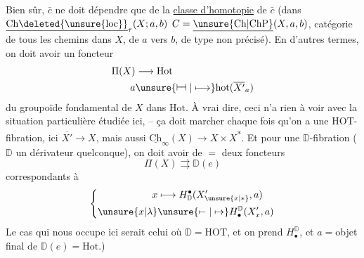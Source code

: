 Bien sûr, $\bar c$ ne doit dépendre que de la
\uline{classe d'homotopie} de $\bar c$ (dans $\underline{\mathrm{Ch}\deleted{\unsure{\mathrm{loc}}}}_{\tau}(X;a,b)$ 
   $C=\underline{\unsure{\mathrm{Ch}|\mathrm{ChP}}}(X,a,b)$, catégorie de
tous les chemins dans $X$, de $a$ vers $b$, de
type non précisé). En d'autres termes, on
doit avoir un foncteur
\[
\begin{aligned}
\Pi(X)&\longrightarrow\mathrm{Hot}\\
a&\unsure{\mathrel{\vdash\!\dashv}|\longmapsto}\mathrm{hot}(\overline{X'}_a)
\end{aligned}
\]
du groupoïde fondamental de $X$ dans $\mathrm{Hot}$.
 À vrai dire, ceci n'a rien à
voir avec la situation particulière étudiée
ici, -- ça doit marcher chaque fois qu'on
a une $\mathrm{HOT}$-fibration, ici $\overline{X'}\longrightarrow X$,
mais aussi $\underline{\mathrm{Ch}}_{\infty}(X)\longrightarrow X\times X$\textsuperscript{*}. Et
pour une $\mathbb D$-fibration  ($\mathbb D$ un dérivateur
quelconque),  on doit avoir de $=$ deux foncteurs
\[
\Pi(X)\rightrightarrows\mathbb D(e)
\]
correspondants à
\[
\left\{\begin{aligned}
x&\longmapsto H^{\bullet}_{\mathbb D}(X'_{\unsure{x|*}},a)\\
\unsure{x|\lambda}&\unsure{\mapstochar\relbar|\mapsto}H^{\mathbb D}_{\bullet}(X'_x,a)
\end{aligned}\right.
\]
Le cas qui nous occupe ici serait celui où
$\mathbb D=\mathrm{HOT}$, et on prend $H^{\mathbb D}_{\bullet}$, et $a={}$objet final de
$\mathbb D(e)=\mathrm{Hot}$.)

